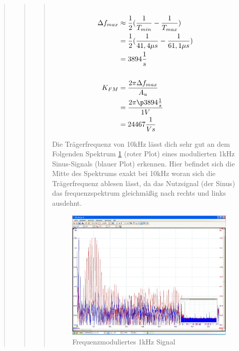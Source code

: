 \begin{quote}
\begin{quote}
\begin{quote}
            
            \begin{equation*}
            \begin{split}
            \\
                \Delta f_{max} &\approx \frac{1}{2} (\frac{1}{T_{min}} - \frac{1}{T_{max}})\\
                               &= \frac{1}{2} (\frac{1}{41,4 \mu s} -\frac{1}{61,1 \mu s})\\
                               &= 3894 \frac{1}{s}\\
            \\
                K_{FM} &=\frac{2 \pi \Delta f_{max}}{A_u}\\
                       &= \frac{2 \pi \p 3894 \frac{1}{s}}{1V}\\
                       &= 24467 \frac{1}{Vs}
            \\
            \end{split}
            \end{equation*}
            \label{equ:}
            
            Die Trägerfrequenz von \si{10}{kHz} lässt dich sehr gut an dem Folgenden Spektrum \ref{fig:freq_1k} (roter Plot)
            eines modulierten \si{1}{kHz} Sinus-Signals (blauer Plot) erkennen. Hier befindet sich die Mitte des Spektrums exakt bei
            \si{10}{kHz} woran sich die Trägerfrequenz ablesen lässt, da das Nutzsignal (der Sinus) das frequenzspektrum
            gleichmäßig nach rechts und links ausdehnt.
            
            \begin{figure}[H]
            \centering
                \includegraphics[scale=0.5, trim = 0.25cm 1.3cm 1cm 3.2cm, clip]{Bilder/freq_1k}
                    \caption{Frequenzmoduliertes 1kHz Signal}
                    \label{fig:freq_1k}
            \end{figure}


\end{quote}
\end{quote}
\end{quote}
